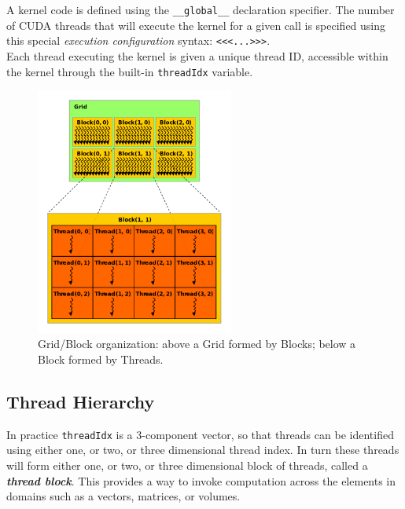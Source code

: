 	A kernel code is defined using the \texttt{\_\_global\_\_} declaration specifier. The number of CUDA threads that will execute the kernel for a given call is specified using this special \textit{execution configuration} syntax: 
	\texttt{<<<...>>>}.\\
	Each thread executing the kernel is given a unique thread ID, accessible within the kernel through the built-in \texttt{threadIdx} variable\cite{cudaguide}.\\
	\begin{figure}
		\raggedleft
		
		\includegraphics[width=0.58\textwidth]{images/gridblocks.png}
		\caption{Grid/Block organization: above a Grid formed by Blocks; below a Block formed by Threads.}
		\label{fig:gridblock}
	\end{figure}

\subsection{Thread Hierarchy}  
\label{subs:thrhierarchy}
	In practice \texttt{threadIdx} is a 3-component vector, so that threads can be identified using either one, or two, or three dimensional thread index.
	In turn these threads will form	either one, or two, or three dimensional block of threads, called a
	\textbf{\textit{thread block}}.
	This provides a way to invoke computation across the elements in domains such as a vectors, matrices, or volumes.

